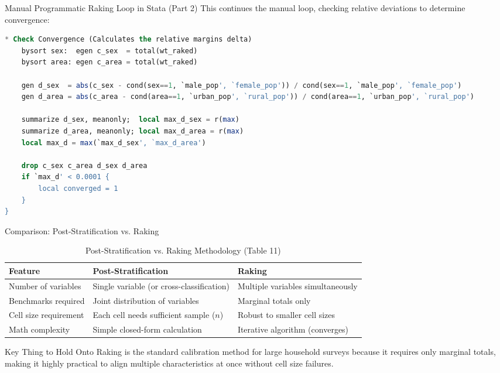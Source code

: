 \documentclass[10pt, aspectratio=169]{beamer}
\begin{document}
\begin{frame}[fragile]{Manual Programmatic Raking Loop in Stata (Part 2)}
  This continues the manual loop, checking relative deviations to determine convergence:
  \begin{lstlisting}[language=SQL]
    * Check Convergence (Calculates the relative margins delta)
    bysort sex:  egen c_sex  = total(wt_raked)
    bysort area: egen c_area = total(wt_raked)
    
    gen d_sex  = abs(c_sex - cond(sex==1, `male_pop', `female_pop')) / cond(sex==1, `male_pop', `female_pop')
    gen d_area = abs(c_area - cond(area==1, `urban_pop', `rural_pop')) / cond(area==1, `urban_pop', `rural_pop')
    
    summarize d_sex, meanonly;  local max_d_sex = r(max)
    summarize d_area, meanonly; local max_d_area = r(max)
    local max_d = max(`max_d_sex', `max_d_area')
    
    drop c_sex c_area d_sex d_area
    if `max_d' < 0.0001 {
        local converged = 1
    }
}
\end{lstlisting}
\end{frame}

\begin{frame}{Comparison: Post-Stratification vs. Raking}
  \begin{table}
    \centering
    \small
    \begin{tabular}{lll}
      \toprule
      \textbf{Feature} & \textbf{Post-Stratification} & \textbf{Raking} \\
      \midrule
      Number of variables & Single variable (or cross-classification) & Multiple variables simultaneously \\
      Benchmarks required & Joint distribution of variables & Marginal totals only \\
      Cell size requirement & Each cell needs sufficient sample ($n$) & Robust to smaller cell sizes \\
      Math complexity & Simple closed-form calculation & Iterative algorithm (converges) \\
      \bottomrule
    \end{tabular}
    \caption{Post-Stratification vs. Raking Methodology (Table 11)}
  \end{table}

  \begin{alertblock}{Key Thing to Hold Onto}
    Raking is the standard calibration method for large household surveys because it requires only marginal totals, making it highly practical to align multiple characteristics at once without cell size failures.
  \end{alertblock}
\end{frame}
\end{document}
